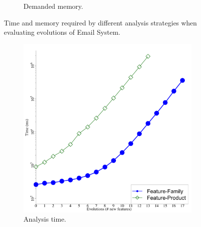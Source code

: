 \begin{figure}[p]
\begin{subfigure}[t]{0.5\columnwidth}
    \caption{Demanded memory.}
    \label{fig:email-footprint}
  \end{subfigure}
  \caption{Time and memory required by different analysis strategies when
  evaluating evolutions of Email System.}
  \label{fig:email-scalability}
\end{figure}


\begin{figure}[p]
  \begin{subfigure}[t]{0.5\columnwidth}
    \centering
    \includegraphics[width=1.0\columnwidth]{img/logminepumpTime}
    \caption{Analysis time.}
    \label{fig:minepump-analysisTime}
  \end{subfigure}
  \begin{subfigure}[t]{0.5\columnwidth}
    \centering

\end{subfigure}
\end{figure}
